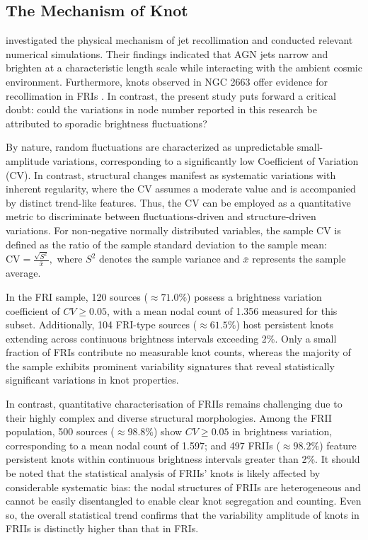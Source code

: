 \documentclass{aa}
\begin{document}
\subsection{The Mechanism of Knot}\label{sec:Section5_3}

\cite{mizuno_recollimation_2015} investigated the physical mechanism of jet recollimation and conducted relevant numerical simulations. Their findings indicated that AGN jets narrow and brighten at a characteristic length scale while interacting with the ambient cosmic environment. Furthermore, knots observed in NGC 2663 offer evidence for recollimation in FRIs \citep{velovic_collimation_2022}. In contrast, the present study puts forward a critical doubt: could the variations in node number reported in this research be attributed to sporadic brightness fluctuations?

By nature, random fluctuations are characterized as unpredictable small-amplitude variations, corresponding to a significantly low Coefficient of Variation (CV). In contrast, structural changes manifest as systematic variations with inherent regularity, where the CV assumes a moderate value and is accompanied by distinct trend-like features. 
Thus, the CV can be employed as a quantitative metric to discriminate between fluctuations-driven and structure-driven variations. For non-negative normally distributed variables, the sample $\mathrm{CV}$ is defined as the ratio of the sample standard deviation to the sample mean: $\mathrm{CV} = \frac{\sqrt{S^2}}{\bar{x}},$ where $S^2$ denotes the sample variance and $\bar{x}$ represents the sample average.


In the FRI sample, 120 sources ($\approx 71.0\%$) possess a brightness variation coefficient of $CV \geq 0.05$, with a mean nodal count of 1.356 measured for this subset. Additionally, 104 FRI-type sources ($\approx 61.5\%$) host persistent knots extending across continuous brightness intervals exceeding 2\%. Only a small fraction of FRIs contribute no measurable knot counts, whereas the majority of the sample exhibits prominent variability signatures that reveal statistically significant variations in knot properties.

In contrast, quantitative characterisation of FRIIs remains challenging due to their highly complex and diverse structural morphologies. Among the FRII population, 500 sources ($\approx 98.8\%$) show $CV \geq 0.05$ in brightness variation, corresponding to a mean nodal count of 1.597; and 497 FRIIs ($\approx 98.2\%$) feature persistent knots within continuous brightness intervals greater than 2\%. It should be noted that the statistical analysis of FRIIs' knots is likely affected by considerable systematic bias: the nodal structures of FRIIs are heterogeneous and cannot be easily disentangled to enable clear knot segregation and counting. Even so, the overall statistical trend confirms that the variability amplitude of knots in FRIIs is distinctly higher than that in FRIs.
\end{document}
